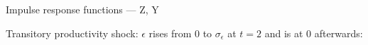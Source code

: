 \documentclass{beamer}
\begin{document}
\begin{frame}{Impulse response functions --- Z, Y}

  Transitory productivity shock: $\epsilon$ rises from 0 to $\sigma_\epsilon$ at $t=2$ and is at 0 afterwards:
\begin{center}
\vspace{-5mm}
\begin{figure}[h!]
\end{figure}
\end{center}

\end{frame}
\end{document}
